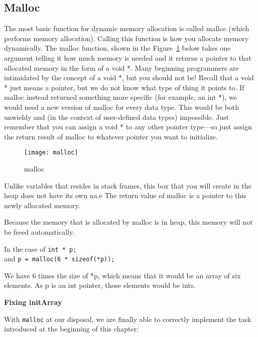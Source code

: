 \documentclass[11pt, a4paper]{article}
\begin{document}
\subsection{Malloc}%
\label{sub:malloc}

The most basic function for dynamic memory allocation is called malloc (which performs memory allocation). Calling this function is how you allocate memory dynamically. The malloc function, shown in the Figure~\ref{fig:malloc} below takes one argument telling it how much memory is needed and it returns a pointer to that allocated memory in the form of a void *. Many beginning programmers are intimidated by the concept of a void *, but you should not be! Recall that a void * just means a pointer, but we do not know what type of thing it points to. If malloc instead returned something more specific (for example, an int *), we would need a new version of malloc for every data type. This would be both unwieldy and (in the context of user-defined data types) impossible. Just remember that you can assign a void * to any other pointer type—so just assign the return result of malloc to whatever pointer you want to initialize.



\begin{figure}[htpb]
  \centering
  \texttt{[image: malloc]}
  \caption{malloc}
  \label{fig:malloc}
\end{figure}


Unlike variables that resides in stack frames, this box that you will create in the heap does not have its own na.e 
The return value of malloc is a pointer to this newly allocated memory. 


Because the memory that is allocated by malloc is in heap, this memory will not be freed automatically. 



In the case of \texttt{int * p;}\\

and \texttt{p = malloc(6 * sizeof(*p));} 

We have 6 times the size of *p, which means that it would be an array of six elements. As p is an int pointer, those elements would be ints. 





\textbf{Fixing initArray}

With \texttt{malloc}  at our disposal, we are finally able to correctly implement the task introduced at the beginning of this chapter:
\end{document}
